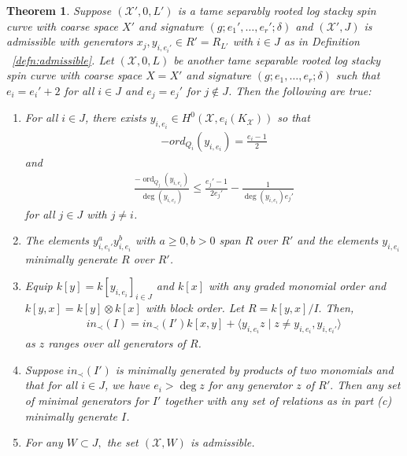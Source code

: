 \documentclass{amsart}
\theoremstyle{plain}
\newtheorem{thm}{Theorem}[section]
\theoremstyle{definition}
\theoremstyle{remark}
\numberwithin{equation}{section}
\newcommand \sx{\mathscr X}
\DeclareMathOperator{\ord}{ord}
\newcommand \subhalf[1]{\frac{{#1} - 1}{2{#1}}}
\newcommand \halfcan{L}
\begin{document}
\begin{thm}
\label{thm:ram_order_ind}
Suppose $(\sx', 0, \halfcan')$ is a tame separably rooted log
stacky spin curve with coarse space $X'$ and signature
$(g; e_1', \ldots, e_r'; \delta)$ and $(\sx', J)$ is
admissible with generators $x_j, y_{i,e_i'} \in R' = R_{L'}$ with
$i \in J$ as in Definition ~\ref{defn:admissible}. Let $(\sx, 0,
\halfcan)$ be another tame separable rooted log stacky spin curve
with coarse space $X = X'$ and signature $(g; e_1, \ldots, e_r;
\delta)$ such that $e_i = e_i' + 2$ for all $i \in J$ and
$e_j = e_j'$ for $j \notin J$. Then the following are true:
\begin{enumerate}
	\item[(a)] For all $i \in J$, there exists $y_{i,e_i} \in
		H^0(\sx, e_i(K_\sx))$ so that
		\begin{align*}
			-ord_{Q_i}(y_{i,e_i}) = \frac{e_i-1}{2}
		\end{align*}
		and
		\begin{align*}
			\frac{-\ord_{Q_j}(y_{i,e_i})}{\deg (y_{i,e_i})} \leq \subhalf{
e_j'}-
			\frac{1}{\deg(y_{i,e_i})e_j'}
		\end{align*}
		for all $j \in J$ with $j \neq i$.
	\item[(b)] The elements $y_{i,e_i'}^ay_{i,e_i}^b$ with $a \geq 0,
		b > 0$ span $R$ over $R'$ and the elements $y_{i,e_i}$ minimally
		generate $R$ over $R'$.
	\item[(c)] Equip $k[y] = k[y_{i,e_i}]_{i \in J}$ and $k[x]$ with
		any graded monomial order and $k[y,x] = k[y] \otimes k[x]$ with
		block order. Let $R = k[y,x]/I.$ Then,
		\begin{align*}
			in_\prec(I) = in_\prec(I')k[x,y] + \langle y_{i,e_i}z \mid z 
			\neq y_{i,e_i},y_{i,e_i'} \rangle
		\end{align*}
		as $z$ ranges over all generators of $R$.
	\item[(d)] Suppose $in_\prec(I')$ is minimally generated by
		products of two monomials and that for all $i \in J$, we have $e
		_i > \deg z$ for any generator $z$ of $R'.$ Then any set of
		minimal generators for $I'$ together with any set of relations 
as in 
		part (c) minimally generate $I$.
	\item[(e)] For any $W \subset J,$ the set $(\sx,W)$ is admissible.
\end{enumerate}
\end{thm}
\end{document}
